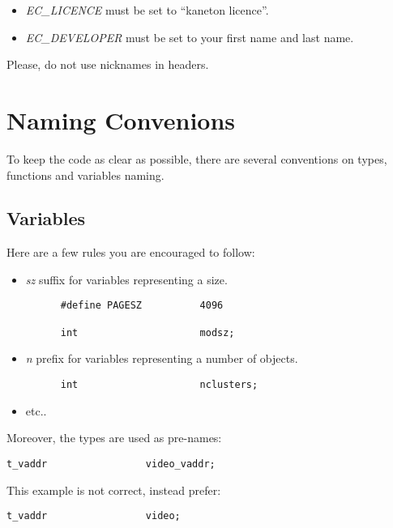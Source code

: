 \begin{itemize}
  \item
    \textit{EC\_LICENCE} must be set to ``kaneton licence''.
  \item
    \textit{EC\_DEVELOPER} must be set to your first name and last name.
\end{itemize}

Please, do not use nicknames in headers.

%
%

\section{Naming Convenions}

To keep the code as clear as possible, there are several conventions on
types, functions and variables naming.

%
%

\subsection{Variables}

Here are a few rules you are encouraged to follow:

\begin{itemize}
  \item
    \textit{sz} suffix for variables representing a size.

    \begin{verbatim}
      #define PAGESZ          4096

      int                     modsz;
    \end{verbatim}
  \item
    \textit{n} prefix for variables representing a number of objects.

    \begin{verbatim}
      int                     nclusters;
    \end{verbatim}
  \item
    etc..
\end{itemize}

Moreover, the types are used as pre-names:

\begin{verbatim}
t_vaddr                 video_vaddr;
\end{verbatim}

This example is not correct, instead prefer:

\begin{verbatim}
t_vaddr                 video;
\end{verbatim}

